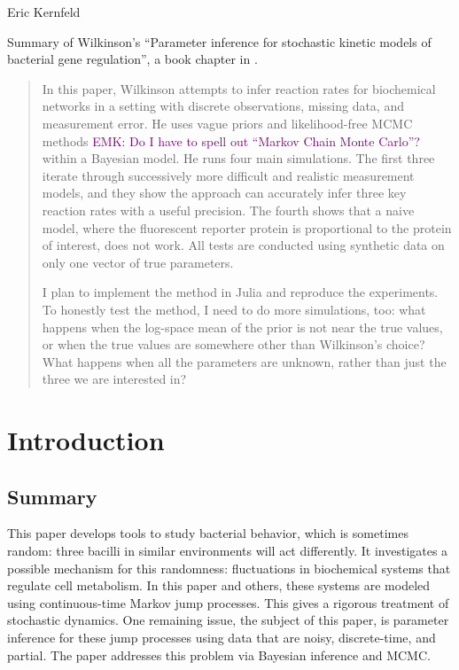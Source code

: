 \documentclass{article}
\newcommand\EMK[1]{\textcolor{purple}{EMK: #1}}
\begin{document}
Eric Kernfeld

Summary of Wilkinson's ``Parameter inference for stochastic kinetic models of bacterial gene regulation'', a book chapter in \cite{Bernardo2012}.

\begin{abstract}
In this paper, Wilkinson attempts to infer reaction rates for biochemical networks in a setting with discrete observations, missing data, and measurement error. He uses vague priors and likelihood-free MCMC methods \EMK{Do I have to spell out ``Markov Chain Monte Carlo''?} within a Bayesian model. He runs four main simulations. The first three iterate through successively more difficult and realistic measurement models, and they show the approach can accurately infer three key reaction rates with a useful precision. The fourth shows that a naive model, where the fluorescent reporter protein is proportional to the protein of interest, does not work. All tests are conducted using synthetic data on only one vector of true parameters.

I plan to implement the method in Julia and reproduce the experiments. To honestly test the method, I need to do more simulations, too: what happens when the log-space mean of the prior is not near the true values, or when the true values are somewhere other than Wilkinson's choice? What happens when all the parameters are unknown, rather than just the three we are interested in?
\end{abstract}


\section{Introduction}
\subsection{Summary}
This paper develops tools to study bacterial behavior, which is sometimes random: three bacilli in similar environments will act differently. It investigates a possible mechanism for this randomness: fluctuations in biochemical systems that regulate cell metabolism. In this paper and others, these systems are modeled using continuous-time Markov jump processes. This gives a rigorous treatment of stochastic dynamics. One remaining issue, the subject of this paper, is parameter inference for these jump processes using data that are noisy, discrete-time, and partial. The paper addresses this problem via Bayesian inference and MCMC.
\end{document}
